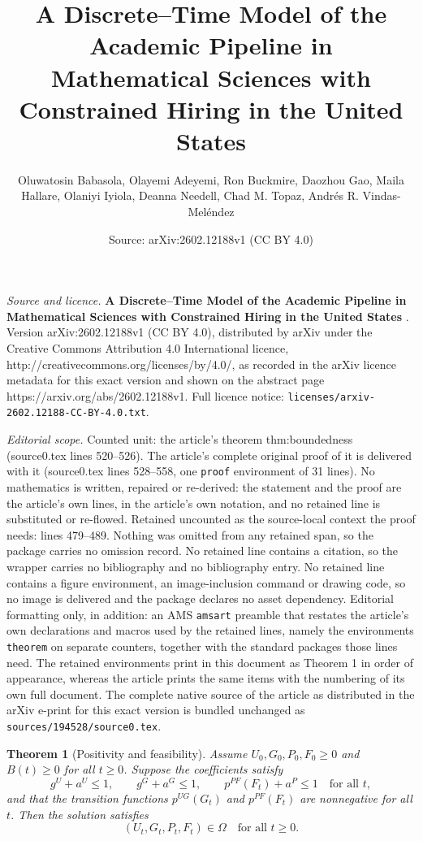 \documentclass[10pt,a4paper]{amsart}
\title{\textbf{A Discrete--Time Model of the Academic Pipeline in Mathematical Sciences with Constrained Hiring in the United States }}
\author{Oluwatosin Babasola, Olayemi Adeyemi, Ron Buckmire, Daozhou Gao, Maila Hallare, Olaniyi Iyiola, Deanna Needell, Chad M. Topaz, Andr\'es R. Vindas-Mel\'endez}
\date{Source: arXiv:2602.12188v1 (CC BY 4.0)}
\newtheorem{theorem}{Theorem}
\begin{document}
\maketitle

\noindent\emph{Source and licence.} \textbf{A Discrete--Time Model of the Academic Pipeline in Mathematical Sciences with Constrained Hiring in the United States }. Version arXiv:2602.12188v1 (CC BY 4.0), distributed by arXiv under the Creative Commons Attribution 4.0 International licence, http://creativecommons.org/licenses/by/4.0/, as recorded in the arXiv licence metadata for this exact version and shown on the abstract page https://arxiv.org/abs/2602.12188v1. Full licence notice: \texttt{licenses/arxiv-2602.12188-CC-BY-4.0.txt}.\par\smallskip

\noindent\textit{Editorial scope.} Counted unit: the article's theorem thm:boundedness (source0.tex lines 520--526). The article's complete original proof of it is delivered with it (source0.tex lines 528--558, one \texttt{proof} environment of 31 lines). No mathematics is written, repaired or re-derived: the statement and the proof are the article's own lines, in the article's own notation, and no retained line is substituted or re-flowed.  Retained uncounted as the source-local context the proof needs: lines 479--489.  Nothing was omitted from any retained span, so the package carries no omission record.  No retained line contains a citation, so the wrapper carries no bibliography and no bibliography entry.  No retained line contains a figure environment, an image-inclusion command or drawing code, so no image is delivered and the package declares no asset dependency.  Editorial formatting only, in addition: an AMS \texttt{amsart} preamble that restates the article's own declarations and macros used by the retained lines, namely the environments \texttt{theorem} on separate counters, together with the standard packages those lines need.  The retained environments print in this document as Theorem 1 in order of appearance, whereas the article prints the same items with the numbering of its own full document.  The complete native source of the article as distributed in the arXiv e-print for this exact version is bundled unchanged as \texttt{sources/194528/source0.tex}.
\begin{theorem}[Positivity and feasibility]\label{thm:positivity}
Assume \(U_0,G_0,P_0,F_0 \geq 0\) and \(B(t)\geq 0\) for all \(t\geq 0\). Suppose the coefficients satisfy
\[
g^U+a^U \leq 1,\qquad g^G+a^G \leq 1,\qquad p^{PF}(F_t)+a^P \leq 1 \quad \text{for all } t,
\]
and that the transition functions \(p^{UG}(G_t)\) and \(p^{PF}(F_t)\) are nonnegative for all \(t\).
Then the solution satisfies
\[
(U_t,G_t,P_t,F_t)\in\Omega \quad \text{for all } t\geq 0.
\]
\end{theorem}
\end{document}

